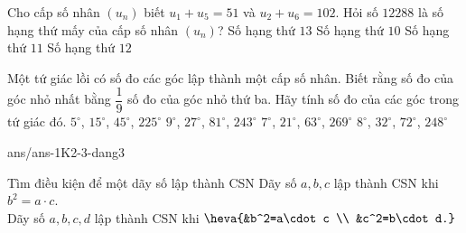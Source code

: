 \begin{ex}%
	Cho cấp số nhân $(u_n)$ biết $u_1+u_5=51$ và $u_2+u_6=102$. Hỏi số $12288$ là số hạng thứ mấy của cấp số nhân $(u_n)$?
	\choice
	{\True Số hạng thứ $13$}
	{Số hạng thứ $10$}
	{Số hạng thứ $11$}
	{Số hạng thứ $12$}
\end{ex}
\begin{ex}%
	Một tứ giác lồi có số đo các góc lập thành một cấp số nhân. Biết rằng số đo của góc nhỏ nhất bằng $\dfrac{1}{9}$ số đo của góc nhỏ thứ ba. Hãy tính số đo của các góc trong tứ giác đó.
	\choice
	{$5^{\circ}$, $15^{\circ}$, $45^{\circ}$, $225^{\circ}$}
	{\True $9^{\circ}$, $27^{\circ}$, $81^{\circ}$, $243^{\circ}$}
	{$7^{\circ}$, $21^{\circ}$, $63^{\circ}$, $269^{\circ}$}
	{$8^{\circ}$, $32^{\circ}$, $72^{\circ}$, $248^{\circ}$}
\end{ex}
\begin{indapan}{10}
	{ans/ans-1K2-3-dang3}
\end{indapan}
\begin{dang}{Tìm điều kiện để một dãy số lập thành CSN}
	Dãy số $a, b, c$ lập thành CSN khi $b^2=a\cdot c$. \\
	Dãy số $a, b, c, d$ lập thành CSN khi $\heva{&b^2=a\cdot c \\ &c^2=b\cdot d.}$
\end{dang}
